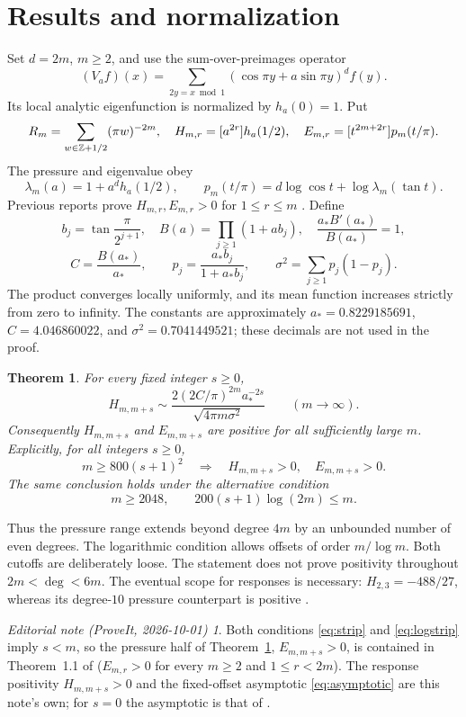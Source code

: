 \documentclass[11pt,a4paper]{article}
\newtheorem{theorem}{Theorem}[section]\newtheorem{lemma}[theorem]{Lemma}
\theoremstyle{remark}\newtheorem*{ednote}{Editorial note (ProveIt, 2026-10-01)}
\begin{document}
\section{Results and normalization}
Set $d=2m$, $m\ge2$, and use the sum-over-preimages operator
\[
(V_af)(x)=\sum_{2y=x\bmod1}(\cos\pi y+a\sin\pi y)^d f(y).
\]
Its local analytic eigenfunction is normalized by $h_a(0)=1$. Put
\[
R_m=\sum_{w\in\mathbb Z+1/2}(\pi w)^{-2m},\quad
H_{m,r}=[a^{2r}]h_a(1/2),\quad E_{m,r}=[t^{2m+2r}]p_m(t/\pi).
\]
The pressure and eigenvalue obey
\begin{equation}\label{eq:feedback}
\lambda_m(a)=1+a^d h_a(1/2),\qquad
p_m(t/\pi)=d\log\cos t+\log\lambda_m(\tan t).
\end{equation}
Previous reports prove $H_{m,r},E_{m,r}>0$ for $1\le r\le m$ \cite{triangle,boundary}. Define
\[
b_j=\tan\frac{\pi}{2^{j+1}},\quad B(a)=\prod_{j\ge1}(1+ab_j),\quad
\frac{a_*B'(a_*)}{B(a_*)}=1,
\]
\[
C=\frac{B(a_*)}{a_*},\qquad p_j=\frac{a_*b_j}{1+a_*b_j},\qquad
\sigma^2=\sum_{j\ge1}p_j(1-p_j).
\]
The product converges locally uniformly, and its mean function increases strictly from zero to infinity. The constants are approximately $a_*=0.8229185691$, $C=4.046860022$, and $\sigma^2=0.7041449521$; these decimals are not used in the proof.
\begin{theorem}\label{thm:main}
For every fixed integer $s\ge0$,
\begin{equation}\label{eq:asymptotic}
H_{m,m+s}\sim\frac{2(2C/\pi)^{2m}a_*^{-2s}}{\sqrt{4\pi m\sigma^2}}
\qquad(m\to\infty).
\end{equation}
Consequently $H_{m,m+s}$ and $E_{m,m+s}$ are positive for all sufficiently large $m$. Explicitly, for all integers $s\ge0$,
\begin{equation}\label{eq:strip}
m\ge800(s+1)^2\quad\Longrightarrow\quad H_{m,m+s}>0,\quad E_{m,m+s}>0.
\end{equation}
The same conclusion holds under the alternative condition
\begin{equation}\label{eq:logstrip}
m\ge2048,\qquad 200(s+1)\log(2m)\le m.
\end{equation}
\end{theorem}
Thus the pressure range extends beyond degree $4m$ by an unbounded number of even degrees. The logarithmic condition allows offsets of order $m/\log m$. Both cutoffs are deliberately loose. The statement does not prove positivity throughout $2m<\deg<6m$. The eventual scope for responses is necessary: $H_{2,3}=-488/27$, whereas its degree-$10$ pressure counterpart is positive \cite{boundary}.
\begin{ednote}
Both conditions \eqref{eq:strip} and \eqref{eq:logstrip} imply $s<m$, so the pressure half of
Theorem~\ref{thm:main}, $E_{m,m+s}>0$, is contained in Theorem~1.1 of 
($E_{m,r}>0$ for every $m\ge2$ and $1\le r<2m$). The response positivity $H_{m,m+s}>0$ and the
fixed-offset asymptotic \eqref{eq:asymptotic} are this note's own; for $s=0$ the asymptotic is
that of .
\end{ednote}
\end{document}
